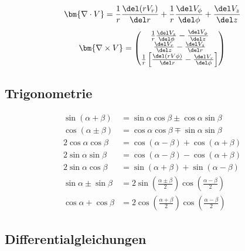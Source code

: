\begin{align*}
    \bm{\nabla \cdot V} = \frac{1}{r}\frac{\del(rV_r)}{\del r} + \frac{1}{r} \frac{\del V_\phi}{\del \phi} + \frac{\del V_z}{\del z}
\end{align*}
\begin{align*}
    \bm{\nabla \times V} = \begin{pmatrix}
        \frac{1}{r} \frac{\del V_z}{\del \phi} - \frac{\del V_\phi}{\del z}\\
        \frac{\del V_r}{\del z} - \frac{\del V_z}{\del r}\\
        \frac{1}{r} \left[\frac{\del(r V\phi)}{\del r} - \frac{\del V_r}{\del \phi}\right]
    \end{pmatrix}
\end{align*}

\subsection{Trigonometrie}

\begin{align*}
    \sin(\alpha + \beta) &= \sin \alpha \cos \beta \pm \cos \alpha \sin \beta\\
    \cos(\alpha \pm \beta) &= \cos \alpha \cos \beta \mp \sin\alpha \sin \beta\\
    2 \cos \alpha \cos \beta &= \cos(\alpha - \beta) + \cos(\alpha + \beta)\\
    2 \sin \alpha \sin \beta &= \cos(\alpha - \beta) - \cos(\alpha + \beta)\\
    2 \sin\alpha \cos \beta &= \sin(\alpha + \beta) + \sin(\alpha - \beta)\\
    \sin \alpha \pm \sin \beta &= 2 \sin \left(\frac{\alpha \pm \beta}{2}\right) \cos \left(\frac{\alpha - \beta}{2}\right)\\
    \cos\alpha + \cos \beta &= 2 \cos \left(\frac{\alpha + \beta}{2}\right) \cos \left(\frac{\alpha - \beta}{2}\right)
\end{align*}

\subsection{Differentialgleichungen}

